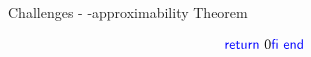 \begin{frame}{Challenges - \WhileCC-approximability Theorem}
\begin{minipage}[t]{0.50\linewidth}
\[{{                        \INDENT{
                        \RETURN 0}\\
                    \FI}\\
                \END}\\
            \] 
        \pause
        \begin{flushright}
            \vspace{-8.5em}
            \pause
            
        \end{flushright}
        
    \end{minipage}

\end{frame}
